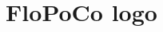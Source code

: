 \documentclass[times, 10pt,twocolumn]{article}
\title{FloPoCo logo}
\begin{document}
 


  \begin{center}
    \scalebox{0.8}{\mbox{}}%
 \end{center}
\end{document}
